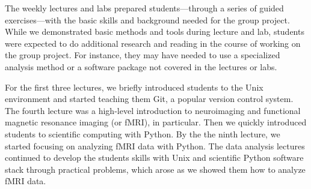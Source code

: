 The weekly lectures and labs prepared students---through a
series of guided exercises---with the basic skills and
background needed for the group project.
While we demonstrated basic methods and tools during lecture and lab,
students were expected to do additional research and reading in the course
of working on the group project.
For instance, they may have needed to use a specialized analysis
method or a software package not covered in the lectures or labs.


For the first three lectures, we briefly introduced students to the Unix
environment and started teaching them Git, a popular version control system.
The fourth lecture was a high-level introduction to neuroimaging and
functional magnetic resonance imaging (or fMRI), in particular.
Then we quickly introduced students to scientific computing with Python.
By the the ninth lecture, we started focusing on analyzing fMRI data
with Python.
The data analysis lectures continued to develop the students skills with
Unix and scientific Python software stack through practical problems,
which arose as we showed them how to analyze fMRI data.




